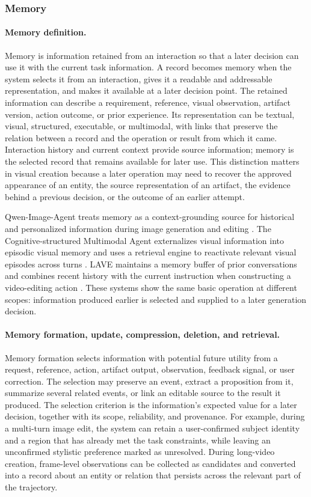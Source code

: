 \subsubsection{Memory}

\paragraph{Memory definition.}
Memory is information retained from an interaction so that a later decision can use it with the current task information. A record becomes memory when the system selects it from an interaction, gives it a readable and addressable representation, and makes it available at a later decision point. The retained information can describe a requirement, reference, visual observation, artifact version, action outcome, or prior experience. Its representation can be textual, visual, structured, executable, or multimodal, with links that preserve the relation between a record and the operation or result from which it came. Interaction history and current context provide source information; memory is the selected record that remains available for later use. This distinction matters in visual creation because a later operation may need to recover the approved appearance of an entity, the source representation of an artifact, the evidence behind a previous decision, or the outcome of an earlier attempt.

Qwen-Image-Agent treats memory as a context-grounding source for historical and personalized information during image generation and editing \cite{avg260626907}. The Cognitive-structured Multimodal Agent externalizes visual information into episodic visual memory and uses a retrieval engine to reactivate relevant visual episodes across turns \cite{avg260708497}. LAVE maintains a memory buffer of prior conversations and combines recent history with the current instruction when constructing a video-editing action \cite{wang2024lave}. These systems show the same basic operation at different scopes: information produced earlier is selected and supplied to a later generation decision.

\paragraph{Memory formation, update, compression, deletion, and retrieval.}
Memory formation selects information with potential future utility from a request, reference, action, artifact output, observation, feedback signal, or user correction. The selection may preserve an event, extract a proposition from it, summarize several related events, or link an editable source to the result it produced. The selection criterion is the information's expected value for a later decision, together with its scope, reliability, and provenance. For example, during a multi-turn image edit, the system can retain a user-confirmed subject identity and a region that has already met the task constraints, while leaving an unconfirmed stylistic preference marked as unresolved. During long-video creation, frame-level observations can be collected as candidates and converted into a record about an entity or relation that persists across the relevant part of the trajectory.

